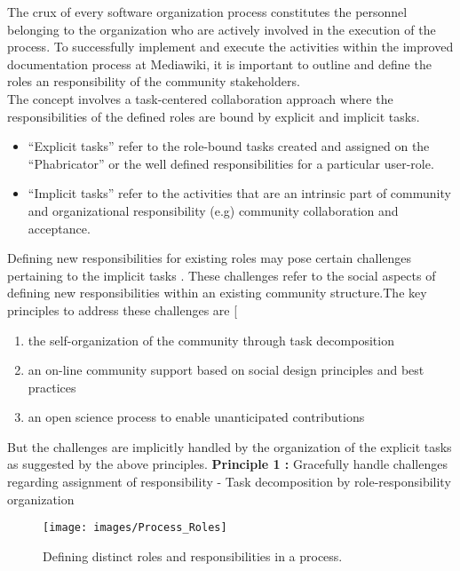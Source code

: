 \indent The crux of every software organization process constitutes the personnel belonging to the organization who are actively involved in the execution of the process. To successfully implement and execute the activities within the improved documentation process at Mediawiki, it is important to outline and define the roles an responsibility of the community stakeholders. 
\\\indent The concept involves a task-centered collaboration approach where the responsibilities of the defined roles are bound by explicit and implicit tasks. 
\begin{itemize}
\item \enquote{Explicit tasks} refer to the role-bound tasks created and assigned on the \enquote{Phabricator} or the well defined responsibilities for a particular user-role.
\item \enquote{Implicit tasks} refer to the activities that are an intrinsic part of community and organizational responsibility (e.g) community collaboration and acceptance.
\end{itemize}
Defining new responsibilities for existing roles may pose certain challenges pertaining to the implicit tasks . These challenges refer to the social aspects of defining new responsibilities within an existing community structure.The key principles to address these challenges are [\cite{Michel_2014}
\begin{enumerate}
\item the self-organization of the community through task decomposition
\item an on-line community support based on social design principles and best practices
\item an open science process to enable unanticipated contributions
\end{enumerate}

But the challenges are implicitly handled by the organization of the explicit tasks as suggested by the above principles. 
\newline
\indent \textbf{Principle 1 : }  Gracefully handle challenges regarding assignment of responsibility  - Task decomposition by role-responsibility organization
\begin{figure}[H]
  \centering
  \texttt{[image: images/Process\_Roles]}
  \caption[Defining distinct roles and responsibilities in a process]{Defining distinct roles and responsibilities in a process.}\label{fig:Process_Roles}
\end{figure}

